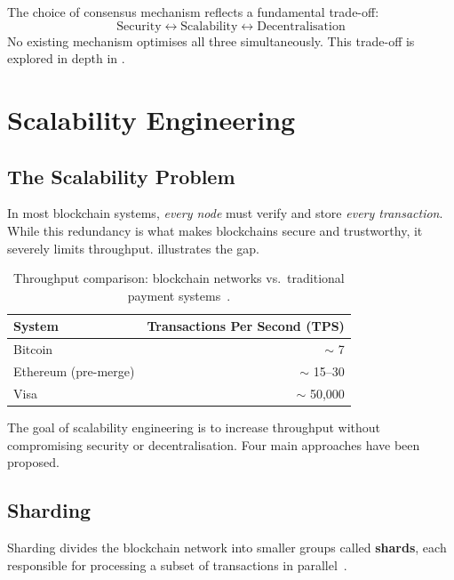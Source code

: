 The choice of consensus mechanism reflects a fundamental trade-off:
\begin{equation}
    \text{Security} \longleftrightarrow \text{Scalability} \longleftrightarrow \text{Decentralisation}
    \label{eq:trilemma-preview}
\end{equation}
No existing mechanism optimises all three simultaneously. This trade-off is explored in depth in .

\section{Scalability Engineering}
\label{sec:scalability}

\subsection{The Scalability Problem}

In most blockchain systems, \emph{every node} must verify and store \emph{every transaction}. While this redundancy is what makes blockchains secure and trustworthy, it severely limits throughput.  illustrates the gap.

\begin{table}[htbp]
\centering
\renewcommand{\arraystretch}{1.2}
\begin{tabular}{l r}
\toprule
\textbf{System} & \textbf{Transactions Per Second (TPS)} \\
\midrule
Bitcoin          & $\sim$ 7 \\
Ethereum (pre-merge) & $\sim$ 15--30 \\
Visa             & $\sim$ 50{,}000 \\
\bottomrule
\end{tabular}
\caption{Throughput comparison: blockchain networks vs.\ traditional payment systems~\cite{kohad2020scalability}.}
\label{tab:throughput}
\end{table}

The goal of scalability engineering is to increase throughput without compromising security or decentralisation. Four main approaches have been proposed.

\subsection{Sharding}
\label{sec:sharding}

Sharding divides the blockchain network into smaller groups called \textbf{shards}, each responsible for processing a subset of transactions in parallel~\cite{luu2016sharding}.

